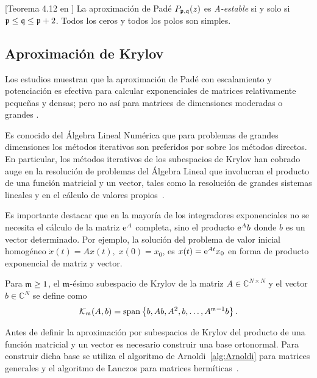\begin{theorem}\label{Stab. Pade}[Teorema 4.12 en \cite{wanner1996solving}] 
    La aproximación de Padé $P_{\mathfrak{p},\mathfrak{q}}(z)$  es \emph{A-estable} si y solo si $\mathfrak{p}\leq \mathfrak{q}\leq \mathfrak{p}+2$. 
    Todos los ceros y todos los polos son simples.
\end{theorem}

\subsection{Aproximación de Krylov}

Los estudios muestran que la aproximación de Padé con escalamiento y potenciación
es efectiva para calcular exponenciales de matrices relativamente pequeñas y densas; pero no así para matrices de dimensiones moderadas o grandes \cite{moler2003nineteen}.

Es conocido del Álgebra Lineal Numérica que para problemas de
grandes dimensiones los métodos iterativos son preferidos por sobre los métodos directos.
En particular,
los métodos iterativos de los subespacios de Krylov han cobrado auge en la resolución de
problemas del Álgebra Lineal que involucran el producto de una función matricial y un vector,
tales como la resolución de grandes sistemas lineales y en el cálculo de valores
propios~\cite{golub2013matrix}.

Es importante destacar que en la mayoría de los integradores exponenciales
 no se necesita el cálculo de la matriz $\mathrm{e}^{A}$ completa, sino
el producto $\mathrm{e}^{A}b$ donde $b$ es un vector determinado. Por ejemplo, la solución del problema de valor inicial homogéneo $\dot{x}(t)=Ax(t),\;x(0)=x_0$, es $x(t)=\mathrm{e}^{At}x_0$ en forma de producto exponencial de matriz y vector. 

\begin{definition}
        \cite{Saad92} Para $\mathfrak{m}\geq 1$, el $\mathfrak{m}$-ésimo subespacio de Krylov de la matriz $A\in\mathbb{C}^{N\times N}$
    y el vector $b\in\mathbb{C}^{N}$ se define como
    \[ \mathcal{K}_{\mathfrak{m}}(A,b)=\mathrm{span}\left\{ b,Ab,A^{2},b,\ldots,A^{\mathfrak{m}-1}b \right\}. \]
\end{definition}

Antes de definir la aproximación por subespacios de Krylov del producto de una función matricial y un vector es
necesario construir una base ortonormal. Para construir dicha base se utiliza el algoritmo de
Arnoldi~\ref{alg:Arnoldi} para matrices generales y el algoritmo de 
Lanczos para matrices hermíticas~\cite{arnoldi,saad2003iterative}.

